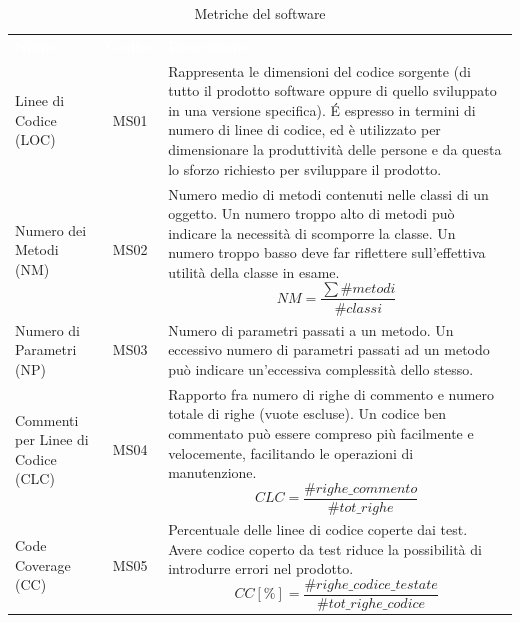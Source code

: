 \begin{table}[H]
	\caption{Metriche del software}
	\begin{center}
	\begin{tabular}{ C{4.5cm} | c | L{9.5cm} }
		\textcolor{white}{\textbf{Nome}} & \textcolor{white}{\textbf{Codice}} & \centerline{\textcolor{white}{\textbf{Descrizione}}} \\
		\label{par:MS01}Linee di Codice (LOC) & MS01 & Rappresenta  le  dimensioni  del  codice  sorgente  (di  tutto  il  prodotto  software oppure di quello sviluppato in una versione specifica). \'E espresso in termini di numero di linee di codice, ed è utilizzato per dimensionare la produttività delle persone e da questa lo sforzo richiesto per sviluppare il prodotto. \\
		Numero dei Metodi (NM)  & MS02 & Numero medio di metodi contenuti nelle classi di un oggetto. Un numero troppo alto di metodi può indicare la necessità di scomporre la classe. Un numero troppo basso deve far riflettere sull'effettiva utilità della classe in esame. 
		\[ NM =\frac{\sum\#metodi}{\#classi}  \] \\
		Numero di Parametri (NP) & MS03 & Numero di parametri passati a un metodo. Un eccessivo numero di parametri passati ad un metodo può
indicare un’eccessiva complessità dello stesso. \\
		Commenti per Linee di \newline Codice (CLC) & MS04 & Rapporto fra numero di righe di commento e numero totale di righe (vuote escluse). Un codice ben commentato può essere compreso più facilmente e velocemente, facilitando le operazioni di manutenzione. 
		\[ CLC = \frac{\#righe\_commento}{\#tot\_righe}\] \\
		Code Coverage (CC) & MS05 & Percentuale delle linee di codice coperte dai test. Avere codice coperto da test riduce la possibilità di introdurre errori nel prodotto. 
		\[ CC[\%] = \frac{\#righe\_codice\_testate}{\#tot\_righe\_codice}\] \\
	\end{tabular}
	\end{center}
	\end{table}
\pagebreak
